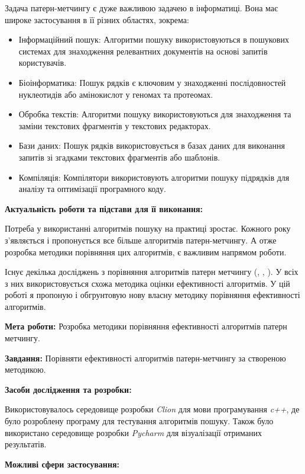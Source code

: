 \documentclass[a4paper,14pt]{extarticle} %
\begin{document}
	Задача патерн-метчингу є дуже важливою задачею в інформатиці. Вона має широке застосування в її різних областях, зокрема:
\begin{itemize}
    \item Інформаційний пошук: Алгоритми пошуку використовуються в пошукових системах для
	знаходження релевантних документів на основі запитів користувачів.
    \item Біоінформатика: Пошук рядків є ключовим у знаходженні послідовностей нуклеотидів або амінокислот у геномах та протеомах. \cite{dna}
    \item Обробка текстів: Алгоритми пошуку використовуються для знаходження та заміни текстових фрагментів у текстових редакторах.
    \item Бази даних: Пошук рядків використовується в базах даних для виконання запитів зі згадками текстових фрагментів або шаблонів.
    \item Компіляція: Компілятори використовують алгоритми пошуку підрядків для аналізу та оптимізації програмного коду.

\end{itemize}


\textbf{Актуальність роботи та підстави для її виконання:}

Потреба у використанні алгоритмів пошуку на практиці зростає. Кожного року з'являється і пропонується все більше алгоритмів патерн-метчингу. А отже розробка методики порівняння цих алгоритмів, є важливим напрямом роботи.

Існує декілька досліджень з порівняння алгоритмів патерн метчингу (\cite{smart}, \cite{exact}, \cite{experiment}). У всіх з них використовується схожа методика оцінки ефективності алгоритмів.
У цій роботі я пропоную і обгрунтовую нову власну методику порівняння ефективності алгоритмів.

\textbf{Мета роботи:} Розробка методики порівняння ефективності алгоритмів патерн метчингу.

\textbf{Завдання:} Порівняти ефективності алгоритмів патерн-метчингу за створеною методикою.

\textbf{Засоби дослідження та розробки:}

Використовувалось середовище розробки \textit{Clion} для мови програмування \textit{c++}, де було розроблену програму для тестування алгоритмів пошуку. Також було використано середовище розробки \textit{Pycharm} для візуалізації отриманих результатів.

\textbf{Можливі сфери застосування:}
\end{document}
